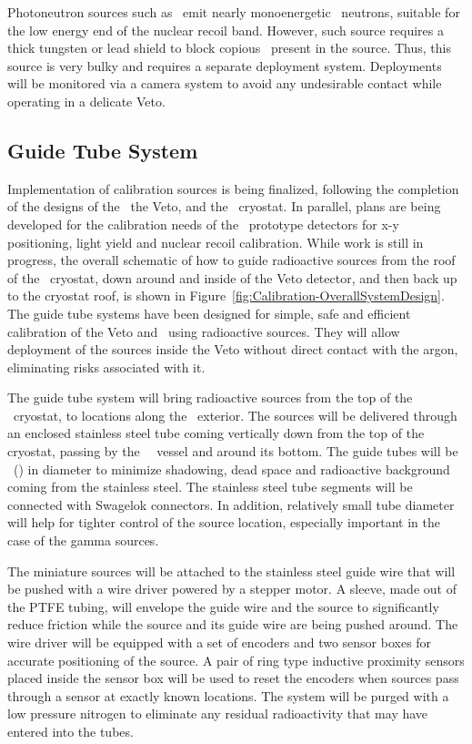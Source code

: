 Photoneutron sources such as \YBe\ emit nearly monoenergetic \YBeNeutronEnergy\ neutrons, suitable for the low energy end of the nuclear recoil band. However, such source requires a %
thick tungsten or lead shield to block copious \grs\ present in the source. Thus, this source is very bulky and requires a separate deployment system. Deployments will be monitored via a camera system to avoid any undesirable contact while operating in a delicate Veto.


\subsection{Guide Tube System}

Implementation of calibration sources is being finalized, following the completion of the designs of the \TPC\, the Veto, and the \AAr\ cryostat. In parallel, plans are being developed for the calibration needs of the \DSks\ prototype detectors for x-y positioning, light yield and nuclear recoil calibration. While work is still in progress, the overall schematic of how to guide radioactive sources from the roof of the \AAr\ cryostat, down around and inside of the Veto detector, and then back up to the cryostat roof, is shown in Figure~\ref{fig:Calibration-OverallSystemDesign}.  The guide tube systems have been designed for simple, safe and efficient calibration of the Veto and \TPC\ using radioactive sources. They will allow deployment of the sources inside the Veto without direct contact with the argon, eliminating risks associated with it. 

The guide tube system will bring radioactive sources from the top of the \AAr\ cryostat, to locations along the \TPC\ exterior. The sources will be delivered through an enclosed stainless steel tube coming vertically down from the top of the cryostat, passing by the \TPC\ \PMMA\ vessel and around its bottom. The guide tubes will be \CalGuideTubeDiameter\ (\CalGuideTubeDiameterInches) in diameter to minimize shadowing, dead space and radioactive background coming from the stainless steel. The stainless steel tube segments will be connected with Swagelok connectors. In addition, relatively small tube diameter will help for tighter control of the source location, especially important in the case of the gamma sources. 

The miniature sources will be attached to the stainless steel guide wire that will be pushed with a wire driver powered by a stepper motor. A sleeve, made out of the PTFE tubing, will envelope the guide wire and the source to significantly reduce friction while the source and its guide wire are being pushed around. The wire driver will be equipped with a set of encoders and two sensor boxes for accurate positioning of the source. A pair of ring type inductive proximity sensors placed inside the sensor box will be used to reset the encoders when sources pass through a sensor at exactly known locations. The system will be purged with a low pressure nitrogen to eliminate any residual radioactivity that may have entered into the tubes.


